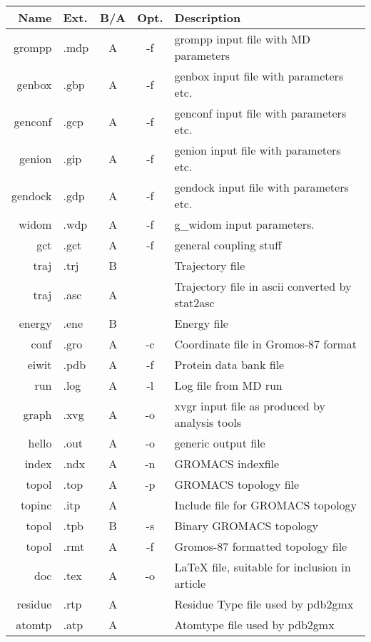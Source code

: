 \begin{table}
\begin{tabularx}{\linewidth}{rlccX}
\hline
    Name &  Ext. & B/A &  Opt. & Description \\
\hline
  grompp &  .mdp &   A &    -f & grompp input file with MD parameters \\
  genbox &  .gbp &   A &    -f & genbox input file with parameters etc. \\
 genconf &  .gcp &   A &    -f & genconf input file with parameters etc. \\
  genion &  .gip &   A &    -f & genion input file with parameters etc. \\
 gendock &  .gdp &   A &    -f & gendock input file with parameters etc. \\
   widom &  .wdp &   A &    -f & g\_widom input parameters. \\
     gct &  .gct &   A &    -f & general coupling stuff \\
    traj &  .trj &   B &       & Trajectory file \\
    traj &  .asc &   A &       & Trajectory file in ascii converted by stat2asc \\
  energy &  .ene &   B &       & Energy file \\
    conf &  .gro &   A &    -c & Coordinate file in Gromos-87 format \\
   eiwit &  .pdb &   A &    -f & Protein data bank file \\
     run &  .log &   A &    -l & Log file from MD run \\
   graph &  .xvg &   A &    -o & xvgr input file as produced by analysis tools \\
   hello &  .out &   A &    -o & generic output file \\
   index &  .ndx &   A &    -n & GROMACS indexfile \\
   topol &  .top &   A &    -p & GROMACS topology file \\
  topinc &  .itp &   A &       & Include file for GROMACS topology \\
   topol &  .tpb &   B &    -s & Binary GROMACS topology \\
   topol &  .rmt &   A &    -f & Gromos-87 formatted topology file \\
     doc &  .tex &   A &    -o & LaTeX file, suitable for inclusion in article \\
 residue &  .rtp &   A &       & Residue Type file used by pdb2gmx \\
  atomtp &  .atp &   A &       & Atomtype file used by pdb2gmx \\

\end{tabularx}
\end{table}
